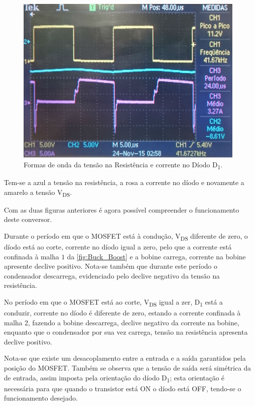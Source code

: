 \documentclass[a4paper,11pt]{article}
\numberwithin{equation}{section}
\begin{document}
\begin{figure}[H]
	\centering
	\includegraphics[keepaspectratio=true, scale=0.14]{img/figs/tensao_resistencia_corrente_d1_buck_boost}
	\caption{Formas de onda da tensão na Resistência e corrente no Díodo D\textsubscript{1}.}
	\label{fig:tensao_resistencia_corrente_d1_buck_boost}
	\vspace{-0.8em}
\end{figure}

Tem-se a azul a tensão na resistência, a rosa a corrente no díodo e novamente a amarelo a tensão V\textsubscript{DS}.

Com as duas figuras anteriores é agora possível compreender o funcionamento deste conversor.

Durante o período em que o MOSFET está à condução, V\textsubscript{DS} diferente de zero, o díodo está ao corte, corrente no díodo igual a zero, pelo que a corrente está confinada à malha $1$ da \autoref{fig:Buck_Boost} e a bobine carrega, corrente na bobine apresente declive positivo. Nota-se também que durante este período o condensador descarrega, evidenciado pelo declive negativo da tensão na resistência.

No período em que o MOSFET está ao corte, V\textsubscript{DS} igual a zer, D\textsubscript{1} está a conduzir, corrente no díodo é diferente de zero, estando a corrente confinada à malha 2, fazendo a bobine descarrega, declive negativo da corrente na bobine, enquanto que o condensador por sua vez carrega, tensão na resistência apresenta declive positivo.

Nota-se que existe um desacoplamento entre a entrada e a saída garantidos pela posição do MOSFET. Também se observa que a tensão de saída será simétrica da de entrada, assim imposta pela orientação do díodo D\textsubscript{1}; esta orientação é necessária para que quando o transistor está ON o díodo está OFF, tendo-se o funcionamento desejado.
\end{document}
